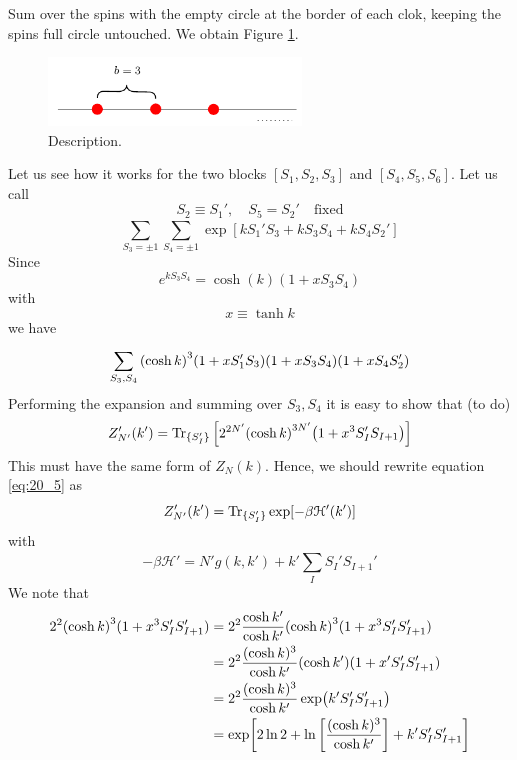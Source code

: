 \documentclass[../main/main.tex]{subfiles}
\begin{document}
Sum over the spins with the empty circle at the border of each clok, keeping the spins full circle untouched.
We obtain Figure \ref{fig:20_2}.

\begin{figure}[h!]
\centering
\includegraphics[width=0.6\textwidth]{../lessons/20_image/2.pdf}
\caption{\label{fig:20_2} Description.}
\end{figure}

Let us see how it works for the two blocks \( [S_1,S_2,S_3] \) and \( [S_4,S_5,S_6] \). Let us call
\begin{equation}
  S_2 \equiv S_1', \quad S_5 = S_2' \quad \text{fixed}
\end{equation}
\begin{equation}
  \sum_{S_3 = \pm 1}^{}   \sum_{S_4 = \pm 1}^{}  \exp [ k S_1' S_3 + k S_3 S_4 + k S_4 S_2']
\end{equation}
Since
\begin{equation}
  e^{k S_3 S_4}  = \cosh (k) ( 1 + x S_3 S_4)
\end{equation}
with
\begin{equation}
  x \equiv \tanh k
\end{equation}
we have
\begin{equation}
  \sum_{S_3,S_4}^{} \qty(\cosh k)^3 \qty(1 + x S_1' S_3) \qty(1 + x S_3 S_4) \qty(1 + x S_4 S_2')
\end{equation}
Performing the expansion and summing over \( S_3, S_4 \)  it is easy to show that (to do)
\begin{equation}
  Z_{N'}' (k') = \Tr_{ \{ S_I' \}  } \qty[ 2 ^{2N'} \qty( \cosh k)^{3N'} \qty(1 + x^3 S_I' S_{I+1} )  ]
  \label{eq:20_5}
\end{equation}
This must have the same form of \( Z_N (k) \). Hence, we should rewrite equation \eqref{eq:20_5} as
\begin{equation}
  Z_{N'}' (k') = \Tr_{ \{ S_I' \}  } \exp [ - \beta \mathcal{H}' (k')]
\end{equation}
with
\begin{equation}
  - \beta \mathcal{H}' = N' g (k,k') + k' \sum_{I}^{} S_I' S_{I+1}'
\end{equation}
We note that
\begin{equation}
\begin{split}
2^2 \qty(\cosh k)^3 (1 + x^3 S_I' S_{I+1}')   &=  2^2 \frac{\cosh k'}{\cosh k'}
 \qty(\cosh k)^3  (1 + x^3 S_I' S_{I+1}') \\
 & = 2^2 \frac{(\cosh k)^3}{\cosh k'}
  \qty(\cosh k')  (1 + x' S_I' S_{I+1}') \\
  & = 2^2 \frac{(\cosh k)^3}{\cosh k'}
   \exp (k' S_I' S_{I+1}') \\
   & = \exp [ 2 \ln{2} + \ln{ \qty[ \frac{(\cosh k)^3}{\cosh k'}] }  + k' S_I' S_{I+1}' ]
\end{split}
\end{equation}
\end{document}
